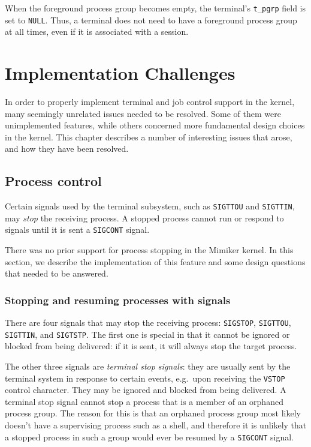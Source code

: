 \documentclass[shortabstract, manyadvisors, english, mgr]{iithesis}
\begin{document}
When the foreground process group becomes empty, the terminal's \texttt{t\_pgrp}
field is set to \texttt{NULL}. Thus, a terminal does not need to have a
foreground process group at all times, even if it is associated with a session.

\chapter{Implementation Challenges}

In order to properly implement terminal and job control support in the kernel,
many seemingly unrelated issues needed to be resolved. Some of them were
unimplemented features, while others concerned more fundamental design choices
in the kernel. This chapter describes a number of interesting issues that arose,
and how they have been resolved.

\section{Process control}

Certain signals used by the terminal subsystem, such as \texttt{SIGTTOU} and
\texttt{SIGTTIN}, may \textit{stop} the receiving process. A stopped process
cannot run or respond to signals until it is sent a \texttt{SIGCONT} signal.

There was no prior support for process stopping in the Mimiker kernel. In this
section, we describe the implementation of this feature and some design
questions that needed to be answered.

\subsection{Stopping and resuming processes with signals}

There are four signals that may stop the receiving process: \texttt{SIGSTOP},
\texttt{SIGTTOU}, \texttt{SIGTTIN}, and \texttt{SIGTSTP}. The first one is
special in that it cannot be ignored or blocked from being delivered: if it is
sent, it will always stop the target process.

The other three signals are \textit{terminal stop signals}: they are usually
sent by the terminal system in response to certain events, e.g.\ upon receiving
the \texttt{VSTOP} control character. They may be ignored and blocked from being
delivered. A terminal stop signal cannot stop a process that is a member of an
orphaned process group. The reason for this is that an orphaned process group
most likely doesn't have a supervising process such as a shell, and therefore it
is unlikely that a stopped process in such a group would ever be resumed by a
\texttt{SIGCONT} signal.
\end{document}
